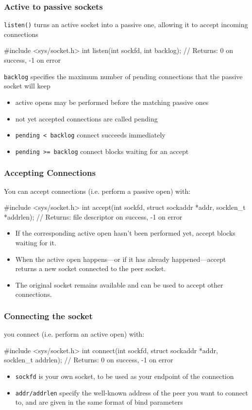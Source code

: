 \documentclass[newPxFont,sthlmFooter,nooffset]{beamer}
\begin{document}
\begin{frame}[t, fragile]
  \frametitle{Active to passive sockets}
\texttt{listen()} turns an active socket into a passive one, allowing it to accept incoming connections

\begin{codedef}
#include <sys/socket.h>
int listen(int sockfd, int backlog);
// Returns: 0 on success, -1 on error
\end{codedef}

\texttt{backlog} specifies the maximum number of pending connections that the passive socket will keep
\begin{itemize}
\item active opens may be performed before the matching passive ones
\item not yet accepted connections are called pending
\item \texttt{pending < backlog} connect succeeds immediately
\item \texttt{pending >= backlog} connect blocks waiting for an accept
\end{itemize}

\end{frame}


\begin{frame}[t, fragile]
  \frametitle{Accepting Connections}
You can accept connections (i.e. perform a passive open) with:
\begin{codedef}
#include <sys/socket.h>
int accept(int sockfd, struct sockaddr *addr, socklen_t *addrlen);
// Returns: file descriptor on success, -1 on error
\end{codedef}
\begin{itemize}
\item If the corresponding active open hasn’t been performed yet, accept blocks waiting for it.
\item When the active open happens---or if it has already happened---accept returns a new socket connected to the peer socket.
\item The original socket remains available and can be used to accept other connections.
\end{itemize}
\end{frame}


\begin{frame}[t, fragile]
  \frametitle{Connecting the socket}
you connect (i.e. perform an active open) with:

\begin{codedef}
#include <sys/socket.h>
int connect(int sockfd, struct sockaddr *addr, socklen_t addrlen);
// Returns: 0 on success, -1 on error
\end{codedef}
\begin{itemize}
\item \texttt{sockfd} is your own socket, to be used as your endpoint of the connection
\item \texttt{addr/addrlen} specify the well-known address of the peer you want to connect to, and are given in the same format of bind parameters
\end{itemize}
\end{frame}
\end{document}
